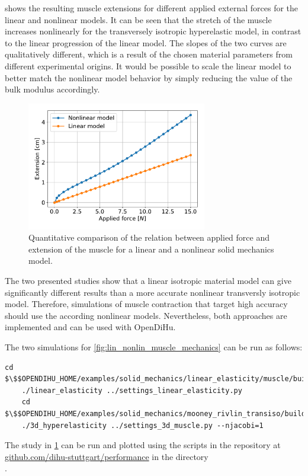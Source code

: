  shows the resulting muscle extensions for different applied external forces for the linear and nonlinear models.
It can be seen that the stretch of the muscle increases nonlinearly for the transversely isotropic hyperelastic model, in contrast to the linear progression of the linear model.
The slopes of the two curves are qualitatively different, which is a result of the chosen material parameters from different experimental origins. It would be possible to scale the linear model to better match the nonlinear model behavior by simply reducing the value of the bulk modulus accordingly.

\begin{figure}
  \centering%
  \includegraphics[width=0.7\textwidth]{images/results/basic/linear_nonlinear_displacements.pdf}%
  \caption{Quantitative comparison of the relation between applied force and extension of the muscle for a linear and a nonlinear solid mechanics model.}%
  \label{fig:linear_nonlinear_displacements}%
\end{figure}

The two presented studies show that a linear isotropic material model can give significantly different results than a more accurate nonlinear transversly isotropic model. Therefore, simulations of muscle contraction that target high accuracy should use the according nonlinear models. Nevertheless, both approaches are implemented and can be used with OpenDiHu.

\begin{reproduce_no_break}
  The two simulations for \cref{fig:lin_nonlin_muscle_mechanics} can be run as follows:
  \begin{lstlisting}[columns=fullflexible,breaklines=true,postbreak=\mbox{\textcolor{gray}{$\hookrightarrow$}\space}]
    cd $\$$OPENDIHU_HOME/examples/solid_mechanics/linear_elasticity/muscle/build_release
    ./linear_elasticity ../settings_linear_elasticity.py
    cd $\$$OPENDIHU_HOME/examples/solid_mechanics/mooney_rivlin_transiso/build_release
    ./3d_hyperelasticity ../settings_3d_muscle.py --njacobi=1
  \end{lstlisting}
  The study in \cref{fig:linear_nonlinear_displacements} can be run and plotted using the scripts in the repository at \href{https://github.com/dihu-stuttgart/performance}{github.com/dihu-stuttgart/performance}
  in the directory \\.
\end{reproduce_no_break}

